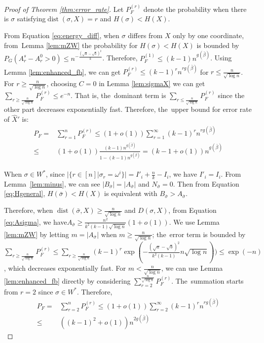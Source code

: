 \documentclass[entropy,article,accept,moreauthors,pdftex]{Definitions/mdpi}
\newcommand{\1}{\mathbbm{1}}
\DeclareMathOperator{\Dist}{dist}
\begin{document}
\begin{paracol}{2}
\begin{proof}[Proof of Theorem \ref{thm:error_rate}]
	Let $P_F^{(r)}$ denote the probability when there is $\sigma$ satisfying\linebreak $\Dist(\sigma, X) = r$ and $H(\sigma) < H(X)$.
	
	From Equation \eqref{eq:energy_diff}, when $\sigma$ differs from $X$ only by one coordinate, from~Lemma \ref{lem:mZW} the probability for $H(\sigma) < H(X)$ is
	bounded by $P_G(A_r^s - A_r^0 > 0) \leq n^{-\frac{(\sqrt{a}-\sqrt{b})^2}{k}}$. Therefore, $P_F^{(1)}  \leq (k-1)n^{g(\bar{\beta})}$.
	Using Lemma \ref{lem:enhanced_fb}, we can get $P_F^{(r)} \leq (k-1)^r n^{rg(\bar{\beta})}$ for $ r \leq \frac{n}{\sqrt{\log n}}$.
	For $ r \geq \frac{n}{\sqrt{\log n}}$, choosing $C=0$ in Lemma \ref{lem:sigmaX} we can get $\sum_{r\geq \frac{n}{\sqrt{\log n}}}P_F^{(r)} \leq e^{-n}$.
	That is, the~dominant term is $\sum_{r\leq \frac{n}{\sqrt{\log n}}}P_F^{(r)}$ since the other part decreases exponentially fast.
	Therefore, the~upper bound for error rate of $\hat{X}'$ is:
	\begin{align*}
	P_F = & \sum_{r=1}^n P_F^{(r)} \leq (1+o(1)) \sum_{r=1}^{\infty} (k-1)^r n^{rg(\bar{\beta})}\\
	\leq & (1+o(1))\frac{(k-1) n^{g(\bar{\beta})}}{1-(k-1) n^{g(\bar{\beta})}} = (k-1+o(1))n^{g(\bar{\beta})}
	\end{align*}
	
When $\sigma \in W^*$, since $|\{r\in [n] | \sigma_r = \omega^i \}| = I'_i + \frac{n}{k} - I_i $, we have $I'_i = I_i$.
From \mbox{Lemma \ref{lem:minus}}, we can see  $|B_{\bar{\sigma}}| = |A_{\bar{\sigma}}|$
and $N_{\bar{\sigma}} = 0$. Then from Equation \eqref{eq:Hgeneral}, $H(\bar{\sigma}) < H(X)$ is equivalent with $B_{\bar{\sigma}} > A_{\bar{\sigma}}$.

Therefore, when $ \Dist(\bar{\sigma}, X) \geq \frac{n}{\sqrt{\log n} }$ and $D(\sigma, X)$,
from Equation \eqref{eq:Asigma}, we have\linebreak $A_{\bar{\sigma}} \geq \frac{n^2}{k^2(k-1)\sqrt{\log n} } (1+o(1))$.
We use Lemma \ref{lem:mZW} by letting $m=|A_{\bar{\sigma}}|$ when $m \geq \frac{n}{ \sqrt{\log n}}$; the~error term is bounded
by $\sum_{r\geq \frac{n}{ \sqrt{\log n}}} P_F^{(r)} \leq \sum_{r\geq \frac{n}{ \sqrt{\log n}}} (k-1)^r \exp(-\frac{(\sqrt{a} - \sqrt{b})^2}{k^2(k-1)} n \sqrt{\log n}))
\leq \exp(-n)$, which decreases exponentially fast.
For $m < \frac{n}{ \sqrt{\log n}}$, we can use Lemma \ref{lem:enhanced_fb} directly 
by considering $\sum_{r=2}^{\frac{n}{ \sqrt{\log n}}} P_F^{(r)}$. The~summation starts from $r=2$ since $\sigma \in W^*$.
Therefore,
\begin{align*}
P_F = & \sum_{r=2}^n P_F^{(r)} \leq (1+o(1)) \sum_{r=2}^{\infty} (k-1)^r n^{rg(\bar{\beta})}\\
\leq & ((k-1)^2+o(1))n^{2g(\bar{\beta})}
\end{align*}
\end{proof}


\end{paracol}
\end{document}
